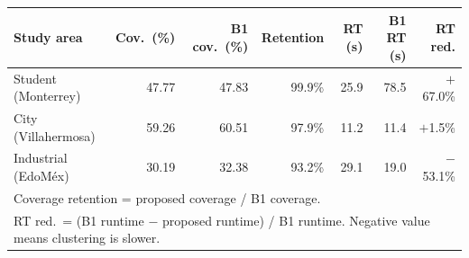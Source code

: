 \begin{tabular}{lrrrrrr}
\toprule
\textbf{Study area}
  & \textbf{Cov.\ (\%)}
  & \textbf{B1 cov.\ (\%)}
  & \textbf{Retention}
  & \textbf{RT (s)}
  & \textbf{B1 RT (s)}
  & \textbf{RT red.} \\
\midrule
Student (Monterrey) & 47.77 & 47.83 & 99.9\% &  25.9 & 78.5 & $+$67.0\% \\
City (Villahermosa) & 59.26 & 60.51 & 97.9\% &  11.2 & 11.4 & $+$1.5\% \\
Industrial (EdoMéx) & 30.19 & 32.38 & 93.2\% &  29.1 & 19.0 & $-$53.1\% \\
\midrule
\multicolumn{7}{l}{\footnotesize Coverage retention = proposed coverage / B1 coverage.} \\
\multicolumn{7}{l}{\footnotesize RT red.\ = (B1 runtime $-$ proposed runtime) / B1 runtime.
                    Negative value means clustering is slower.} \\
\bottomrule
\end{tabular}
